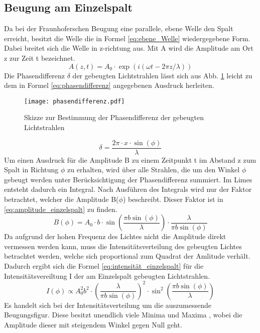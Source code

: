 \subsection{Beugung am Einzelspalt}
Da bei der Fraunhoferschen Beugung eine parallele, ebene Welle den Spalt erreicht, besitzt die Welle die in Formel \eqref{eq:ebene_Welle} wiedergegebene Form. Dabei breitet sich die Welle in z-richtung aus. Mit A wird die Amplitude am Ort z zur Zeit t bezeichnet.
%
\begin{equation}
A(z,t) = A_0 \cdot \exp(i(\omega t - 2 \pi z / \lambda))
\label{eq:ebene_Welle}
\end{equation}
%
Die Phasendifferenz $\delta$ der gebeugten Lichtstrahlen lässt sich aus Abb. \ref{fig:phasendifferenz} leicht zu dem in Formel \eqref{eq:phasendifferenz} angegebenen Ausdruck herleiten.
\begin{figure}
\centering
\texttt{[image: phasendifferenz.pdf]}
\caption{Skizze zur Bestimmung der Phasendifferenz der gebeugten Lichtstrahlen}
\label{fig:phasendifferenz}
\end{figure}
%
\begin{equation}
\delta  = \frac{2 \pi \cdot x \cdot \sin(\phi)}{\lambda}
\label{eq:phasendifferenz}
\end{equation}
%
Um einen Ausdruck für die Amplitude B zu einem Zeitpunkt t im Abstand z zum Spalt in Richtung $\phi$ zu erhalten, wird über alle Strahlen, die um den Winkel $\phi$ gebeugt werden unter Berücksichtigung der Phasendifferenz summiert. Im Limes entsteht dadurch ein Integral. Nach Ausführen des Integrals wird nur der Faktor betrachtet, welcher die Amplitude B($\phi$) beschreibt. Dieser Faktor ist in \eqref{eq:amplitude_einzelspalt} zu finden.
%
\begin{equation}
B(\phi) = A_0 \cdot b \cdot \sin\left(\frac{\pi b \sin(\phi)}{\lambda}\right) \cdot \frac{\lambda}{\pi b \sin(\phi)}
\label{eq:amplitude_einzelspalt}
\end{equation}
%
 Da aufgrund der hohen Frequenz des Lichtes nicht die Amplitude direkt vermessen werden kann, muss die Intensitätsverteilung des gebeugten Lichtes betrachtet werden, welche sich proportional zum Quadrat der Amlitude verhält. Dadurch ergibt sich die Formel \eqref{eq:intensität_einzelspalt} für die Intensitätsvereiltung I der am Einzelspalt gebeugten Lichtstrahlen.
%
\begin{equation}
I(\phi) \propto A_{0}^2 b^2 \cdot \left(\frac{\lambda}{\pi b \sin(\phi)}\right)^2 \cdot \sin^2\left(\frac{\pi b \sin(\phi)}{\lambda}\right)
\label{eq:intensität_einzelspalt}
\end{equation}
%
Es handelt sich bei der Intensitätsverteilung um die auszumessende Beugungsfigur. Diese besitzt unendlich viele Minima und Maxima , wobei die Amplitude dieser mit steigendem Winkel gegen Null geht.
%
